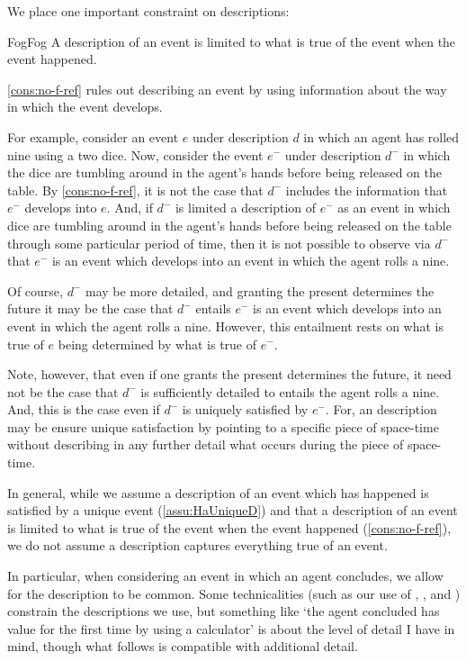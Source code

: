 \begin{note}
  We place one important constraint on descriptions:

  \begin{constraint}{Fog}{Fog}%
    \label{cons:no-f-ref}%
    A description of an event is limited to what is true of the event when the event happened.
  \end{constraint}

  \noindent%
  \autoref{cons:no-f-ref} rules out describing an event by using information about the way in which the event develops.

  For example, consider an event \(e\) under description \(d\) in which an agent has rolled nine using a two dice.
  Now, consider the event \(e^{-}\) under description \(d^{-}\) in which the dice are tumbling around in the agent's hands before being released on the table.
  By \autoref{cons:no-f-ref}, it is not the case that \(d^{-}\) includes the information that \(e^{-}\) develops into \(e\).
  And, if \(d^{-}\) is limited a description of \(e^{-}\) as an event in which dice are tumbling around in the agent's hands before being released on the table through some particular period of time, then it is not possible to observe via \(d^{-}\) that \(e^{-}\) is an event which develops into an event in which the agent rolls a nine.

  Of course, \(d^{-}\) may be more detailed, and granting the present determines the future it may be the case that \(d^{-}\) entails \(e^{-}\) is an event which develops into an event in which the agent rolls a nine.
  However, this entailment rests on what is true of \(e\) being determined by what is true of \(e^{-}\).

  Note, however, that even if one grants the present determines the future, it need not be the case that \(d^{-}\) is sufficiently detailed to entails the agent rolls a nine.
  And, this is the case even if \(d^{-}\) is uniquely satisfied by \(e^{-}\).
  For, an description may be ensure unique satisfaction by pointing to a specific piece of space-time without describing in any further detail what occurs during the piece of space-time.
\end{note}


\begin{note}
  In general, while we assume a description of an event which has happened is satisfied by a unique event (\autoref{assu:HaUniqueD}) and that a description of an event is limited to what is true of the event when the event happened (\autoref{cons:no-f-ref}), we do not assume a description captures everything true of an event.

  In particular, when considering an event in which an agent concludes, we allow for the description to be common.
  Some technicalities (such as our use of , , and ) constrain the descriptions we use, but something like `the agent concluded \gistCalcEq{} has value  for the first time by using a calculator' is about the level of detail I have in mind, though what follows is compatible with additional detail.
\end{note}



